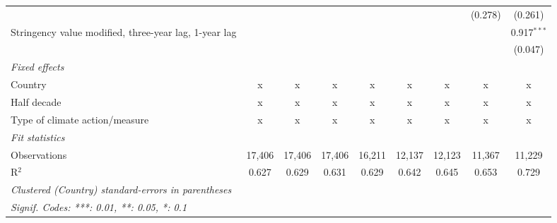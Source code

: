 \begin{table}[htbp]
\begin{tabular}{lcccccccc}
                                                                                                      &                &               &               &               &               &               & (0.278)       & (0.261)\\   
      Stringency value modified, three-year lag, 1-year lag                                           &                &               &               &               &               &               &               & 0.917$^{***}$\\   
                                                                                                      &                &               &               &               &               &               &               & (0.047)\\   
      \emph{Fixed effects}\\
      Country                                                                                         & x              & x             & x             & x             & x             & x             & x             & x\\  
      Half decade                                                                                     & x              & x             & x             & x             & x             & x             & x             & x\\  
      Type of climate action/measure                                                                  & x              & x             & x             & x             & x             & x             & x             & x\\  
      \midrule \emph{Fit statistics}\\
      Observations                                                                                    & 17,406         & 17,406        & 17,406        & 16,211        & 12,137        & 12,123        & 11,367        & 11,229\\  
      R$^2$                                                                                           & 0.627          & 0.629         & 0.631         & 0.629         & 0.642         & 0.645         & 0.653         & 0.729\\  
      \midrule
      \multicolumn{9}{l}{\emph{Clustered (Country) standard-errors in parentheses}}\\
      \multicolumn{9}{l}{\emph{Signif. Codes: ***: 0.01, **: 0.05, *: 0.1}}\\
   \end{tabular}
\end{table}


